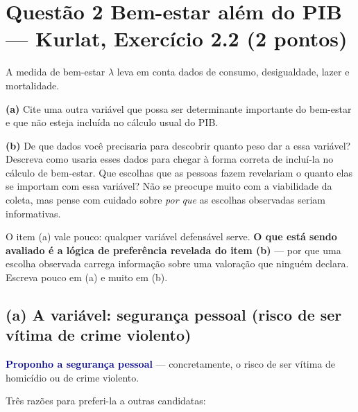 \documentclass[11pt, a4paper]{article}
\newcommand{\resp}[1]{\textcolor{darkblue}{\textbf{#1}}}
\begin{document}
\section[Questão 2 --- Bem-estar além do PIB (Kurlat 2.2)]{Questão 2 \quad Bem-estar além do PIB --- Kurlat, Exercício 2.2 \hfill \normalsize (2 pontos)}

\begin{tcolorbox}[questionbox]
\small
A medida de bem-estar $\lambda$ leva em conta dados de consumo, desigualdade, lazer e
mortalidade.

\textbf{(a)} Cite uma outra variável que possa ser determinante importante do bem-estar e
que não esteja incluída no cálculo usual do PIB.

\textbf{(b)} De que dados você precisaria para descobrir quanto peso dar a essa variável?
Descreva como usaria esses dados para chegar à forma correta de incluí-la no cálculo de
bem-estar. Que escolhas que as pessoas fazem revelariam o quanto elas se importam com essa
variável? Não se preocupe muito com a viabilidade da coleta, mas pense com cuidado sobre
\emph{por que} as escolhas observadas seriam informativas.
\end{tcolorbox}

\begin{tcolorbox}[theorybox, title={Onde está o peso da questão}]
\small
O item (a) vale pouco: qualquer variável defensável serve. \textbf{O que está sendo
avaliado é a lógica de preferência revelada do item (b)} --- por que uma escolha
observada carrega informação sobre uma valoração que ninguém declara. Escreva pouco em
(a) e muito em (b).
\end{tcolorbox}

\subsection*{(a) A variável: segurança pessoal (risco de ser vítima de crime violento)}

\resp{Proponho a segurança pessoal} --- concretamente, o risco de ser vítima de homicídio
ou de crime violento.

Três razões para preferi-la a outras candidatas:
\end{document}
